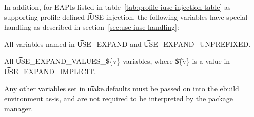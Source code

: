 In addition, for EAPIs listed in table~\ref{tab:profile-iuse-injection-table} as supporting profile
defined \t{IUSE} injection, the following variables have special handling as described in
section~\ref{sec:use-iuse-handling}:
\begin{compactitem}
\item All variables named in \t{USE_EXPAND} and \t{USE_EXPAND_UNPREFIXED}.
\item All \t{USE_EXPAND_VALUES_\$\{v\}} variables, where \t{\$\{v\}} is a value in
    \t{USE_EXPAND_IMPLICIT}.
\end{compactitem}

Any other variables set in \t{make.defaults} must be passed on into the ebuild environment as-is,
and are not required to be interpreted by the package manager.


